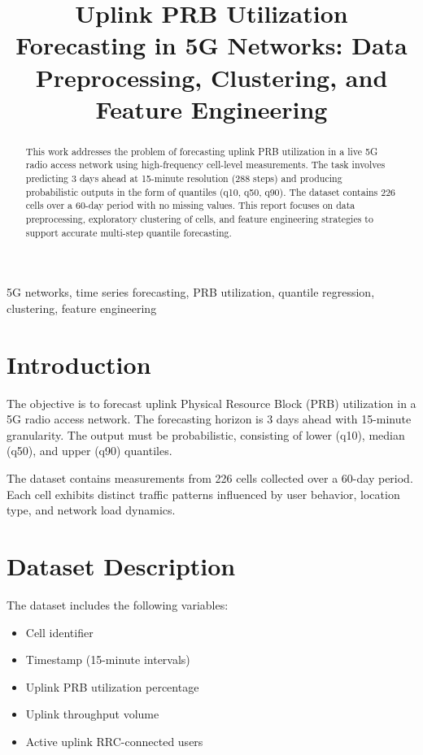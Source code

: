 \documentclass[conference]{IEEEtran}
\begin{document}
\title{Uplink PRB Utilization Forecasting in 5G Networks: Data Preprocessing, Clustering, and Feature Engineering}

\author{
\and
{}
}

\maketitle

\begin{abstract}
This work addresses the problem of forecasting uplink PRB utilization in a live 5G radio access network using high-frequency cell-level measurements. The task involves predicting 3 days ahead at 15-minute resolution (288 steps) and producing probabilistic outputs in the form of quantiles (q10, q50, q90). The dataset contains 226 cells over a 60-day period with no missing values. This report focuses on data preprocessing, exploratory clustering of cells, and feature engineering strategies to support accurate multi-step quantile forecasting.
\end{abstract}

\begin{IEEEkeywords}
5G networks, time series forecasting, PRB utilization, quantile regression, clustering, feature engineering
\end{IEEEkeywords}

\section{Introduction}
The objective is to forecast uplink Physical Resource Block (PRB) utilization in a 5G radio access network. The forecasting horizon is 3 days ahead with 15-minute granularity. The output must be probabilistic, consisting of lower (q10), median (q50), and upper (q90) quantiles.

The dataset contains measurements from 226 cells collected over a 60-day period. Each cell exhibits distinct traffic patterns influenced by user behavior, location type, and network load dynamics.

\section{Dataset Description}
The dataset includes the following variables:
\begin{itemize}
\item Cell identifier
\item Timestamp (15-minute intervals)
\item Uplink PRB utilization percentage
\item Uplink throughput volume
\item Active uplink RRC-connected users
\end{itemize}
\end{document}
